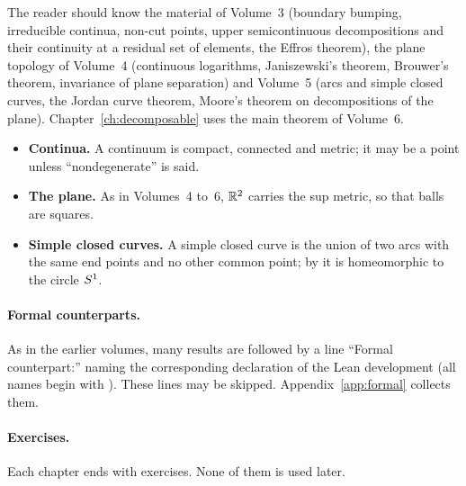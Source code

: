 The reader should know the material of Volume~3 (boundary bumping, irreducible continua, non-cut points, upper semicontinuous decompositions and their continuity at a
residual set of elements, the Effros theorem), the plane topology of Volume~4 (continuous logarithms, Janiszewski's theorem, Brouwer's theorem, invariance of plane separation)
and Volume~5 (arcs and simple closed curves, the Jordan curve theorem, Moore's theorem on decompositions of the plane). Chapter~\ref{ch:decomposable} uses the main theorem of
Volume~6.

\begin{itemize}
\item \textbf{Continua.} A continuum is compact, connected and metric; it may be a point unless ``nondegenerate'' is said.
\item \textbf{The plane.} As in Volumes~4 to~6, $\mathbb{R}^2$ carries the sup metric, so that balls are squares.
\item \textbf{Simple closed curves.} A simple closed curve is the union of two arcs with the same end points and no other common point; by  it is
homeomorphic to the circle $S^1$.
\end{itemize}

\paragraph{Formal counterparts.} As in the earlier volumes, many results are followed by a line ``Formal counterpart:'' naming the corresponding declaration of the
Lean development (all names begin with ). These lines may be skipped. Appendix~\ref{app:formal} collects them.

\paragraph{Exercises.} Each chapter ends with exercises. None of them is used later.
